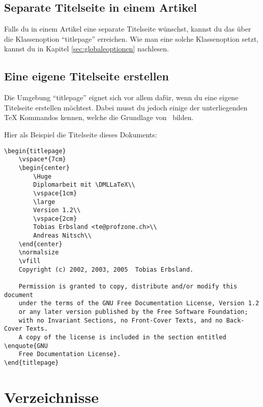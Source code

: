 \subsection{Separate Titelseite in einem Artikel}
\label{sec:separatetitelseite}

Falls du in einem Artikel eine separate Titelseite wünschst, kannst du das über die Klassenoption \enquote{titlepage} erreichen. Wie man eine solche Klassenoption setzt, kannst du in Kapitel \ref{sec:globaleoptionen} nachlesen.

\subsection{Eine eigene Titelseite erstellen}

Die Umgebung \enquote{titlepage} eignet sich vor allem dafür, wenn du eine eigene Titelseite erstellen möchtest. Dabei musst du jedoch einige der unterliegenden {\rmfamily\TeX} Kommandos kennen, welche die Grundlage von \DMLLaTeX \ bilden.

Hier als Beispiel die Titelseite dieses Dokuments:
\begin{lstlisting}[frame=tb, caption=Titelseite dieses Dokuments]
\begin{titlepage}
	\vspace*{7cm}
	\begin{center}
		\Huge
		Diplomarbeit mit \DMLLaTeX\\
		\vspace{1cm}
		\large
		Version 1.2\\
		\vspace{2cm}
		Tobias Erbsland <te@profzone.ch>\\
		Andreas Nitsch\\
	\end{center}
	\normalsize
	\vfill
	Copyright (c) 2002, 2003, 2005  Tobias Erbsland.

	Permission is granted to copy, distribute and/or modify this document
	under the terms of the GNU Free Documentation License, Version 1.2
	or any later version published by the Free Software Foundation;
	with no Invariant Sections, no Front-Cover Texts, and no Back-Cover Texts.
	A copy of the license is included in the section entitled \enquote{GNU
	Free Documentation License}.
\end{titlepage}
\end{lstlisting}

\section{Verzeichnisse}

